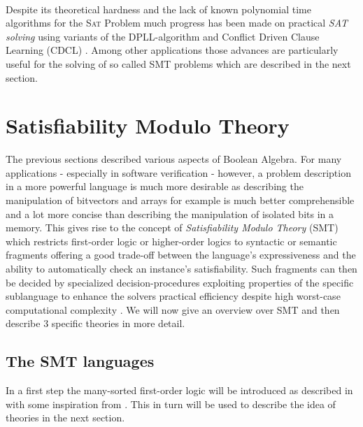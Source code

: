 \paragraph{}
Despite its theoretical hardness and the lack of known polynomial time algorithms for the \textsc{Sat} Problem much progress has been made on practical \textit{SAT solving} using variants of the DPLL-algorithm and Conflict Driven Clause Learning (CDCL) \cite{Marques-Silva-PropositionalSATSolving}.  Among other applications those advances are particularly useful for the solving of so called SMT problems which are described in the next section.


\section{Satisfiability Modulo Theory}
The previous sections described various aspects of Boolean Algebra. For many applications - especially in software verification - however, a problem description in a more powerful language is much more desirable as describing the manipulation of bitvectors and arrays for example is much better comprehensible and a lot more concise than describing the manipulation of isolated bits in a memory. This gives rise to the concept of \textit{Satisfiability Modulo Theory} (SMT) which restricts first-order logic or higher-order logics to syntactic or semantic fragments offering a good trade-off between the language's expressiveness and the ability to automatically check an instance's satisfiability. Such fragments can then be decided by specialized decision-procedures exploiting properties of the specific sublanguage to enhance the solvers practical efficiency despite high worst-case computational complexity \cite{Barrett-Tinelli-SMT}. We will now give an overview over SMT and then describe 3 specific theories in more detail.

\subsection{The SMT languages}
In a first step the many-sorted first-order logic will be introduced as described in \cite{Barrett-Tinelli-SMT} with some inspiration from \cite{fondements-logique}. This in turn will be used to describe the idea of theories in the next section.

